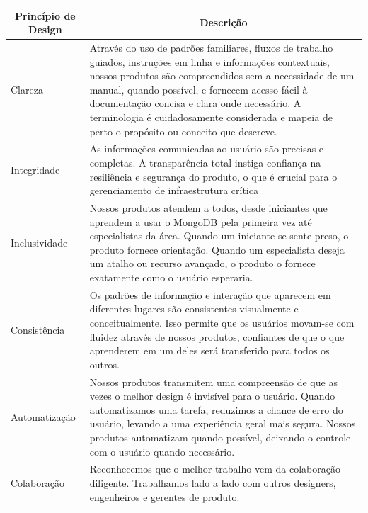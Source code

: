 \begin{quadro}[!htb]
	\centering
	\begin{tabular}{|m{2cm}|m{12cm}|} \hline
		
		\multicolumn{1}{|c|}{\bfseries Princípio de Design} & \multicolumn{1}{c|}{\bfseries Descrição} \\\hline
		
		 Clareza & Através do uso de padrões familiares, fluxos de trabalho guiados, instruções em linha e informações contextuais, nossos produtos são compreendidos sem a necessidade de um manual, quando possível, e fornecem acesso fácil à documentação concisa e clara onde necessário. A terminologia é cuidadosamente considerada e mapeia de perto o propósito ou conceito que descreve. \\\hline
		 
		 Integridade & As informações comunicadas ao usuário são precisas e completas. A transparência total instiga confiança na resiliência e segurança do produto, o que é crucial para o gerenciamento de infraestrutura crítica \\\hline
		 
		 Inclusividade & Nossos produtos atendem a todos, desde iniciantes que aprendem a usar o MongoDB pela primeira vez até especialistas da área. Quando um iniciante se sente preso, o produto fornece orientação. Quando um especialista deseja um atalho ou recurso avançado, o produto o fornece exatamente como o usuário esperaria. \\\hline
		 
		 Consistência & Os padrões de informação e interação que aparecem em diferentes lugares são consistentes visualmente e conceitualmente. Isso permite que os usuários movam-se com fluidez através de nossos produtos, confiantes de que o que aprenderem em um deles será transferido para todos os outros. \\\hline
		 
		 Automatização & Nossos produtos transmitem uma compreensão de que as vezes o melhor design é invisível para o usuário. Quando automatizamos uma tarefa, reduzimos a chance de erro do usuário, levando a uma experiência geral mais segura. Nossos produtos automatizam quando possível, deixando o controle com o usuário quando necessário. \\\hline
		 
		 Colaboração & Reconhecemos que o melhor trabalho vem da colaboração diligente. Trabalhamos lado a lado com outros designers, engenheiros e gerentes de produto. \\\hline
		 

\end{tabular}
\end{quadro}
